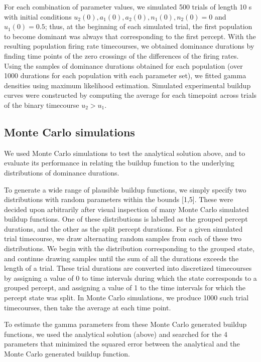 \documentclass{frontiersSCNS} %
\begin{document}
For each combination of parameter values, we simulated 500 trials of length 10 s with initial conditions $u_2(0), a_1(0), a_2(0), n_1(0), n_2(0) = 0$ and $u_1(0) = 0.5$; thus, at the beginning of each simulated trial, the first population to become dominant was always that corresponding to the first percept. With the resulting population firing rate timecourses, we obtained dominance durations by finding time points of the zero crossings of the differences of the firing rates. Using the samples of dominance durations obtained for each population (over 1000 durations for each population with each parameter set), we fitted gamma densities using maximum likelihood estimation. Simulated experimental buildup curves were constructed by computing the average for each timepoint across trials of the binary timecourse $u_2 > u_1$. 


\subsection{Monte Carlo simulations}

We used Monte Carlo simulations to test the analytical solution above, and to evaluate its performance in relating the buildup function to the underlying distributions of dominance durations.

To generate a wide range of plausible buildup functions, we simply specify two distributions with random parameters within the bounds [1,5]. These were decided upon arbitrarily after visual inspection of many Monte Carlo simulated buildup functions. One of these distributions is labelled as the grouped percept durations, and the other as the split percept durations. For a given simulated trial timecourse, we draw alternating random samples from each of these two distributions. We begin with the distribution corresponding to the grouped state, and continue drawing samples until the sum of all the durations exceeds the length of a trial. These trial durations are converted into discretized timecourses by assigning a value of 0 to time intervals during which the state corresponds to a grouped percept, and assigning a value of 1 to the time intervals for which the percept state was split. In Monte Carlo simulations, we produce 1000 such trial timecourses, then take the average at each time point.

To estimate the gamma parameters from these Monte Carlo generated buildup functions, we used the analytical solution (above) and searched for the 4 parameters that minimized the squared error between the analytical and the Monte Carlo generated buildup function. 
\end{document}
